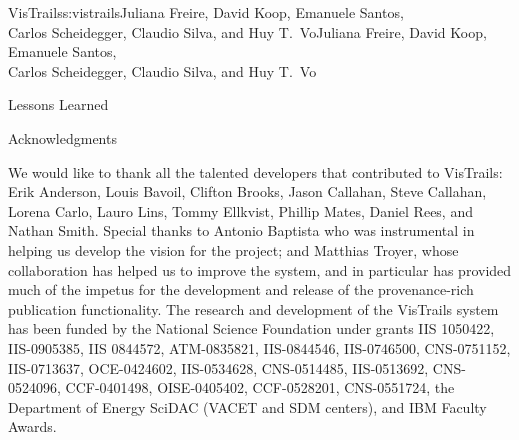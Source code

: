 \begin{aosachaptertoc}{VisTrails}{s:vistrails}{Juliana Freire, David Koop, Emanuele Santos, \\ Carlos Scheidegger, Claudio Silva, and Huy T.\ Vo}{Juliana Freire, David Koop, Emanuele Santos, \\ \hspace*{0.9cm} Carlos Scheidegger, Claudio Silva, and Huy T.\ Vo}
\begin{aosasect1}{Lessons Learned}
\begin{aosasect2}{Acknowledgments}

We would like to thank all the talented developers that contributed to
VisTrails: Erik Anderson, Louis Bavoil, Clifton Brooks, Jason
Callahan, Steve Callahan, Lorena Carlo, Lauro Lins, Tommy Ellkvist,
Phillip Mates, Daniel Rees, and Nathan Smith. Special thanks to
Antonio Baptista who was instrumental in helping us develop the vision
for the project; and Matthias Troyer, whose collaboration has helped
us to improve the system, and in particular has provided much of the
impetus for the development and release of the provenance-rich
publication functionality. The research and development of the
VisTrails system has been funded by the National Science Foundation under grants IIS 1050422, IIS-0905385, IIS 0844572, ATM-0835821,
IIS-0844546, IIS-0746500, CNS-0751152, IIS-0713637, OCE-0424602,
IIS-0534628, CNS-0514485, IIS-0513692, CNS-0524096, CCF-0401498,
OISE-0405402, CCF-0528201, CNS-0551724,
the Department of Energy SciDAC (VACET and SDM centers), and IBM Faculty Awards.

\end{aosasect2}

\end{aosasect1}

\end{aosachaptertoc}
